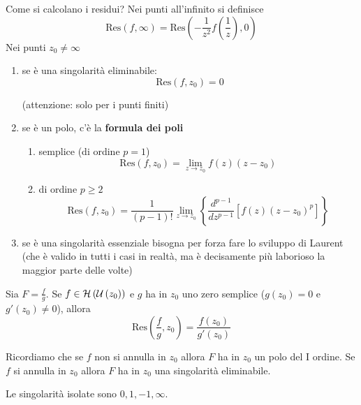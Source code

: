 \begin{rem}
Come si calcolano i residui?
Nei punti all'infinito si definisce
\begin{equation*}
\mathrm{Res}\left( f,\infty \right) =\mathrm{Res}\left( -\frac{1}{z^{2}} f\left(\frac{1}{z}\right) ,0\right)
\end{equation*}
Nei punti $z_{0} \neq \infty $
\begin{enumerate}
\item se è una singolarità eliminabile:\begin{equation*}
\mathrm{Res}\left( f,z_{0}\right) =0
\end{equation*}

(attenzione: solo per i punti finiti)
\item se è un polo, c'è la \textbf{formula dei poli}
\begin{enumerate}
\item semplice (di ordine $p=1$)\begin{equation*}
\mathrm{Res}\left( f,z_{0}\right) =\lim\limits _{z\rightarrow z_{0}} f\left( z\right)\left( z-z_{0}\right)
\end{equation*}
\item di ordine $p\geqslant 2$\begin{equation*}
\mathrm{Res}\left( f,z_{0}\right) =\frac{1}{\left( p-1\right) !}\lim\limits _{z\rightarrow z_{0}}\left\{\frac{d^{p-1}}{dz^{p-1}}\left[ f\left( z\right)\left( z-z_{0}\right)^{p}\right]\right\}
\end{equation*}
\end{enumerate}
\item se è una singolarità essenziale bisogna per forza fare lo sviluppo di Laurent (che è valido in tutti i casi in realtà, ma è decisamente più laborioso la maggior parte delle volte)
\end{enumerate}
\end{rem}
\begin{thm}
Sia $F=\frac{f}{g}$. Se $f\in \mathcal{H} \left(\mathcal{U}\left( z_{0}\right)\right)$ e $g$ ha in $z_{0}$ uno zero semplice ($g\left( z_{0}\right) =0$ e $g'\left( z_{0}\right) \neq 0$), allora\begin{equation*}
\mathrm{Res}\left(\frac{f}{g} ,z_{0}\right) =\frac{f\left( z_{0}\right)}{g'\left( z_{0}\right)}
\end{equation*}

Ricordiamo che se $f$ non si annulla in $z_{0}$ allora $F$ ha in $z_{0}$ un polo del I ordine. Se $f$ si annulla in $z_{0}$ allora $F$ ha in $z_{0}$ una singolarità eliminabile.
\end{thm}
Le singolarità isolate sono $0,1,-1,\infty $.

